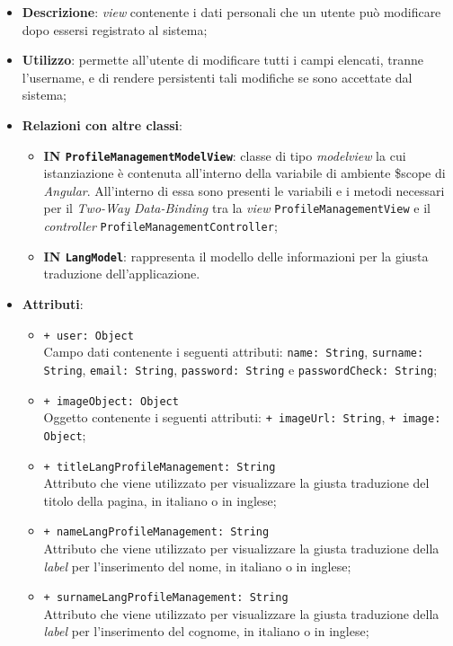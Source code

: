 \begin{itemize}
	\item \textbf{Descrizione}: \textit{view} contenente i dati personali che un utente può modificare dopo essersi registrato al sistema;
	\item \textbf{Utilizzo}: permette all'utente di modificare tutti i campi elencati, tranne l'username, e di rendere persistenti tali modifiche se sono accettate dal sistema;
	\item \textbf{Relazioni con altre classi}:
	\begin{itemize}
		\item \textbf{IN \texttt{ProfileManagementModelView}}: classe di tipo \textit{modelview} la cui istanziazione è contenuta all'interno della variabile di ambiente \$scope di \textit{Angular}. All'interno di essa sono presenti le variabili e i metodi necessari per il \textit{Two-Way Data-Binding} tra la \textit{view} \texttt{ProfileManagementView} e il \textit{controller} \texttt{ProfileManagementController};
		\item \textbf{IN \texttt{LangModel}}: rappresenta il modello delle informazioni per la giusta traduzione dell'applicazione.
	\end{itemize}
	\item \textbf{Attributi}:
	\begin{itemize}
		\item \texttt{+ user: Object} \\ Campo dati contenente i seguenti attributi: \texttt{name: String}, \texttt{surname: String}, \texttt{email: String}, \texttt{password: String} e \texttt{passwordCheck: String};
		\item \texttt{+ imageObject: Object} \\ Oggetto contenente i seguenti attributi: \texttt{+ imageUrl: String}, \texttt{+ image: Object};
		\item \texttt{+ titleLangProfileManagement: String} \\ Attributo che viene utilizzato per visualizzare la giusta traduzione del titolo della pagina, in italiano o in inglese;
		\item \texttt{+ nameLangProfileManagement: String} \\ Attributo che viene utilizzato per visualizzare la giusta traduzione della \textit{label} per l'inserimento del nome, in italiano o in inglese;
		\item \texttt{+ surnameLangProfileManagement: String} \\ Attributo che viene utilizzato per visualizzare la giusta traduzione della \textit{label} per l'inserimento del cognome, in italiano o in inglese;

\end{itemize}
\end{itemize}

